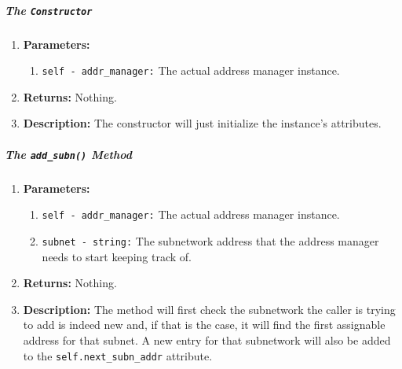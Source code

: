        \subparagraph{The \texttt{Constructor}}
            \begin{enumerate}
                \item \textbf{Parameters:}
                \begin{enumerate}
                    \item \texttt{self - addr\_manager:} The actual address manager instance.
                \end{enumerate}
                \item \textbf{Returns:} Nothing.
                \item \textbf{Description:} The constructor will just initialize the instance's attributes.
            \end{enumerate}

        \subparagraph{The \texttt{add\_subn()} Method}
            \begin{enumerate}
                \item \textbf{Parameters:}
                \begin{enumerate}
                    \item \texttt{self - addr\_manager:} The actual address manager instance.
                    \item \texttt{subnet - string:} The subnetwork address that the address manager needs to start keeping track of.
                \end{enumerate}
                \item \textbf{Returns:} Nothing.
                \item \textbf{Description:} The method will first check the subnetwork the caller is trying to add is indeed new and, if that is the case, it will find the first assignable address for that subnet. A new entry for that subnetwork will also be added to the \texttt{self.next\_subn\_addr} attribute.
            \end{enumerate}


